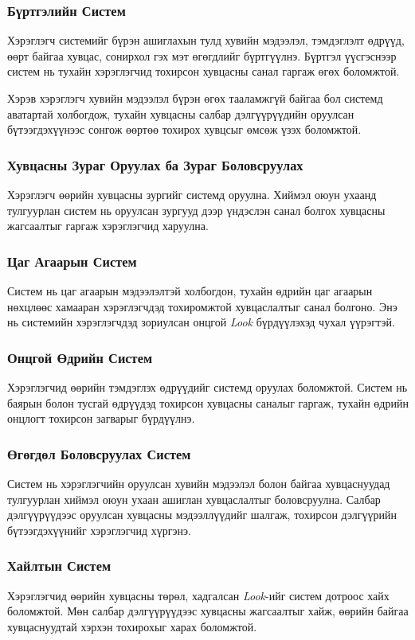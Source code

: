 \subsubsection{Бүртгэлийн Систем}
Хэрэглэгч системийг бүрэн ашиглахын тулд хувийн мэдээлэл, тэмдэглэлт өдрүүд, өөрт байгаа хувцас, сонирхол гэх мэт өгөгдлийг бүртгүүлнэ. Бүртгэл үүсгэснээр систем нь тухайн хэрэглэгчид тохирсон хувцасны санал гаргаж өгөх боломжтой.

Хэрэв хэрэглэгч хувийн мэдээлэл бүрэн өгөх тааламжгүй байгаа бол системд аватартай холбогдож, тухайн хувцасны салбар дэлгүүрүүдийн оруулсан бүтээгдэхүүнээс сонгож өөртөө тохирох хувцсыг өмсөж үзэх боломжтой.

\subsubsection{Хувцасны Зураг Оруулах ба Зураг Боловсруулах}
Хэрэглэгч өөрийн хувцасны зургийг системд оруулна. Хиймэл оюун ухаанд тулгуурлан систем нь оруулсан зургууд дээр үндэслэн санал болгох хувцасны жагсаалтыг гаргаж хэрэглэгчид харуулна.

\subsubsection{Цаг Агаарын Систем}
Систем нь цаг агаарын мэдээлэлтэй холбогдон, тухайн өдрийн цаг агаарын нөхцлөөс хамааран хэрэглэгчдэд тохиромжтой хувцаслалтыг санал болгоно. Энэ нь системийн хэрэглэгчдэд зориулсан онцгой \textit{Look} бүрдүүлэхэд чухал үүрэгтэй.

\subsubsection{Онцгой Өдрийн Систем}
Хэрэглэгчид өөрийн тэмдэглэх өдрүүдийг системд оруулах боломжтой. Систем нь баярын болон тусгай өдрүүдэд тохирсон хувцасны саналыг гаргаж, тухайн өдрийн онцлогт тохирсон загварыг бүрдүүлнэ.

\subsubsection{Өгөгдөл Боловсруулах Систем}
Систем нь хэрэглэгчийн оруулсан хувийн мэдээлэл болон байгаа хувцаснуудад тулгуурлан хиймэл оюун ухаан ашиглан хувцаслалтыг боловсруулна. Салбар дэлгүүрүүдээс оруулсан хувцасны мэдээллүүдийг шалгаж, тохирсон дэлгүүрийн бүтээгдэхүүнийг хэрэглэгчид хүргэнэ.

\subsubsection{Хайлтын Систем}
Хэрэглэгчид өөрийн хувцасны төрөл, хадгалсан \textit{Look}-ийг систем дотроос хайх боломжтой. Мөн салбар дэлгүүрүүдээс хувцасны жагсаалтыг хайж, өөрийн байгаа хувцаснуудтай хэрхэн тохирохыг харах боломжтой.

